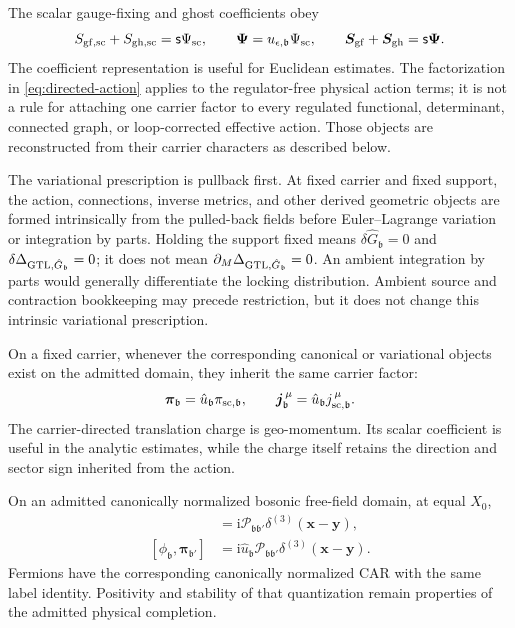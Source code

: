 \documentclass[final,5p,times,twocolumn,numbers,nopreprintline]{elsarticle}
\numberwithin{equation}{section}
\theoremstyle{definition}
\theoremstyle{remark}
\newcommand{\ii}{\mathrm i}
\newcommand{\bb}{\mathfrak b}
\newcommand{\BR}{\mathsf s}
\newcommand{\vct}[1]{\boldsymbol{#1}}
\begin{document}
The scalar gauge-fixing and ghost coefficients obey
\[
 S_{{\rm gf},{\rm sc}}+S_{{\rm gh},{\rm sc}}
       =\BR\Psi_{\rm sc},\qquad
 \vct\Psi=u_{\epsilon,\bb}\Psi_{\rm sc},\qquad
 \vct S_{\rm gf}+\vct S_{\rm gh}=\BR\vct\Psi.
\]
The coefficient representation is useful for Euclidean estimates.
The factorization in \eqref{eq:directed-action} applies to the
regulator-free physical action terms; it is not a rule for attaching
one carrier factor to every regulated functional, determinant,
connected graph, or loop-corrected effective action. Those objects
are reconstructed from their carrier characters as described below.

The variational prescription is pullback first. At fixed carrier and
fixed support, the action, connections, inverse metrics, and other
derived geometric objects are formed intrinsically from the pulled-back
fields before Euler--Lagrange variation or integration by parts.
Holding the support fixed means
\(\delta\hat G_{\bb}=0\) and
\(\delta\Delta_{{\rm GTL},\hat G_{\bb}}=0\); it does not mean
\(\partial_M\Delta_{{\rm GTL},\hat G_{\bb}}=0\).
An ambient integration by parts would generally differentiate the
locking distribution. Ambient source and contraction bookkeeping may
precede restriction, but it does not change this intrinsic
variational prescription.

On a fixed carrier, whenever the corresponding
canonical or variational objects exist on the admitted domain,
they inherit the same carrier factor:
\[
 \vct\pi_{\bb}=\hat u_{\bb}\pi_{{\rm sc},\bb},
 \qquad \vct j_{\bb}^{\,\mu}
          =\hat u_{\bb}j_{{\rm sc},\bb}^{\,\mu}.
\]
The carrier-directed translation charge is geo-momentum. Its scalar
coefficient is useful in the analytic estimates, while the charge
itself retains the direction and sector sign inherited from the action.

On an admitted canonically normalized bosonic free-field domain,
at equal \(X_0\),
\begin{align}
 [\phi_{\bb}(X_0,\mathbf x),
     \pi_{{\rm sc},\bb'}(X_0,\mathbf y)]
   &=\ii\mathcal P_{\bb\bb'}\delta^{(3)}(\mathbf x-\mathbf y),
 \label{eq:ccr}\\
 [\phi_{\bb},\vct\pi_{\bb'}]
   &=\ii\hat u_{\bb}\mathcal P_{\bb\bb'}
       \delta^{(3)}(\mathbf x-\mathbf y).
 \label{eq:vector-ccr}
\end{align}
Fermions have the corresponding canonically normalized CAR with
the same label identity. Positivity and stability of that
quantization remain properties of the admitted physical completion.
\end{document}
